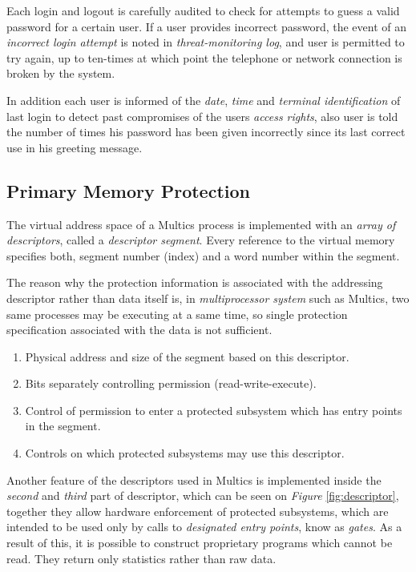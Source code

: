 Each login and logout is carefully audited to check for attempts to guess a valid password for a certain user. 
If a user provides incorrect password, the event of an \textit{incorrect login attempt} is noted in \textit{
threat-monitoring log}, and user is permitted to try again, up to ten-times at which point the telephone or network 
connection is broken by the system.

In addition each user is informed of the \textit{date}, \textit{time} and \textit{terminal identification} of last
login to detect past compromises of the users \textit{access rights}, also user is told the number of times his password 
has been given incorrectly since its last correct use in his greeting message. 


\subsection{Primary Memory Protection}

The virtual address space of a Multics process is implemented with an \textit{array of descriptors}, called 
a \textit{descriptor segment}. Every reference to the virtual memory specifies both, segment number (index) and a 
word number within the segment.

The reason why the protection information is associated with the addressing descriptor rather than data itself is, 
in \textit{multiprocessor system} such as Multics, two same processes may be executing at a same time, so single 
protection specification associated with the data is not sufficient.

\begin{enumerate}
    \item Physical address and size of the segment based on this descriptor.
    \item Bits separately controlling permission (read-write-execute).
    \item Control of permission to enter a protected subsystem which has entry points in the segment.
    \item Controls on which protected subsystems may use this descriptor.
\end{enumerate}

Another feature of the descriptors used in Multics is implemented inside the \textit{second} and \textit{third} part of descriptor, 
which can be seen on \textit{Figure} \ref{fig:descriptor}, together they allow hardware enforcement of protected subsystems, 
which are intended to be used only by calls to \textit{designated entry points}, know as \textit{gates}. As a result of this, 
it is possible to construct proprietary programs which cannot be read. They return only statistics rather than raw data.

